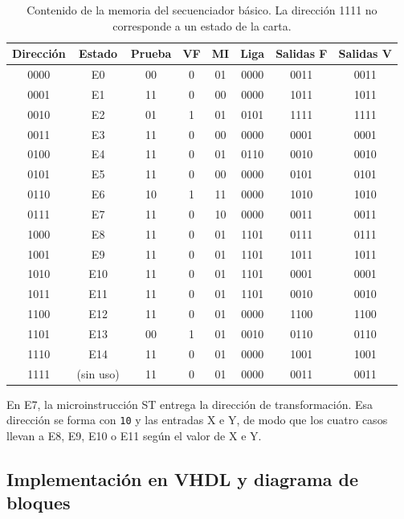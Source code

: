 \begin{table}[htbp]
  \centering
  \caption{Contenido de la memoria del secuenciador básico. La dirección 1111 no corresponde a un
  estado de la carta.}
  \label{tab:memoria}
  \small
  \setlength{\tabcolsep}{4pt}
  \begin{tabular}{@{}c c c c c c c c@{}}
    \toprule
    \textbf{Dirección} & \textbf{Estado} & \textbf{Prueba} & \textbf{VF} & \textbf{MI} & \textbf{Liga} & \textbf{Salidas F} & \textbf{Salidas V} \\
    \midrule
    0000 & E0  & 00 & 0 & 01 & 0000 & 0011 & 0011 \\
    0001 & E1  & 11 & 0 & 00 & 0000 & 1011 & 1011 \\
    0010 & E2  & 01 & 1 & 01 & 0101 & 1111 & 1111 \\
    0011 & E3  & 11 & 0 & 00 & 0000 & 0001 & 0001 \\
    0100 & E4  & 11 & 0 & 01 & 0110 & 0010 & 0010 \\
    0101 & E5  & 11 & 0 & 00 & 0000 & 0101 & 0101 \\
    0110 & E6  & 10 & 1 & 11 & 0000 & 1010 & 1010 \\
    0111 & E7  & 11 & 0 & 10 & 0000 & 0011 & 0011 \\
    1000 & E8  & 11 & 0 & 01 & 1101 & 0111 & 0111 \\
    1001 & E9  & 11 & 0 & 01 & 1101 & 1011 & 1011 \\
    1010 & E10 & 11 & 0 & 01 & 1101 & 0001 & 0001 \\
    1011 & E11 & 11 & 0 & 01 & 1101 & 0010 & 0010 \\
    1100 & E12 & 11 & 0 & 01 & 0000 & 1100 & 1100 \\
    1101 & E13 & 00 & 1 & 01 & 0010 & 0110 & 0110 \\
    1110 & E14 & 11 & 0 & 01 & 0000 & 1001 & 1001 \\
    1111 & (sin uso) & 11 & 0 & 01 & 0000 & 0011 & 0011 \\
    \bottomrule
  \end{tabular}
\end{table}

En E7, la microinstrucción ST entrega la dirección de transformación. Esa dirección se forma con
\texttt{10} y las entradas X e Y, de modo que los cuatro casos llevan a E8, E9, E10 o E11
según el valor de X e Y.

\subsection{Implementación en VHDL y diagrama de bloques}

